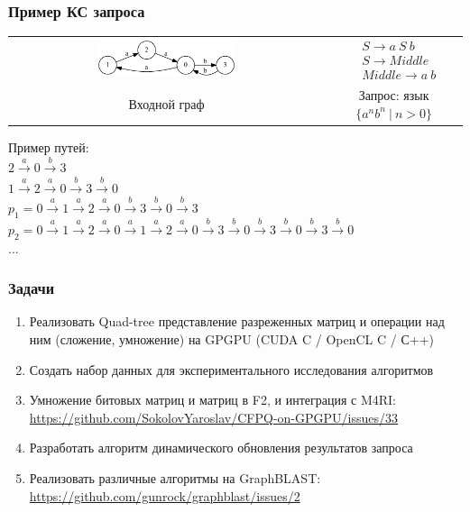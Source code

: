\documentclass[xcolor=table]{beamer}
\begin{document}
\begin{frame} \frametitle{Пример КС запроса}
\begin{center}
  \begin{tabular}{  c  c  }
      \includegraphics[width=0.45\textwidth]{pictures/input.pdf}
      &
  $

  \begin{array}{rl}
     & S \rightarrow a \ S \ b \\
     & S \rightarrow Middle \\
     & Middle \rightarrow a \ b
  \end{array}

  $
  \\
  Входной граф
  &
  Запрос: язык $\{a^nb^n \ | \ n > 0 \}$ 

  \end{tabular}

\end{center}

\pause

\vspace{0.5cm}
Пример путей: \\
$2 \xrightarrow{a} 0 \xrightarrow{b} 3$ \\
$1 \xrightarrow{a} 2 \xrightarrow{a} 0 \xrightarrow{b} 3 \xrightarrow{b} 0$ \\
$p_1 = 0 \xrightarrow{a} 1 \xrightarrow{a} 2 \xrightarrow{a} 0 \xrightarrow{b} 3 \xrightarrow{b} 0 \xrightarrow{b} 3$ \\
$p_2 = 0 \xrightarrow{a} 1 \xrightarrow{a} 2 \xrightarrow{a} 0 \xrightarrow{a} 1 \xrightarrow{a} 2 \xrightarrow{a} 0 \xrightarrow{b} 3 \xrightarrow{b} 0 \xrightarrow{b} 3 \xrightarrow{b} 0 \xrightarrow{b} 3 \xrightarrow{b} 0$ \\
$\dots$

\end{frame}

\begin{frame}[fragile] \frametitle{Задачи}
  \begin{enumerate}
    \item Реализовать Quad-tree представление разреженных матриц и операции над ним (сложение, умножение) на GPGPU (CUDA C / OpenCL C / С++)
    \pause
    \item Создать набор данных для экспериментального исследования алгоритмов
    \pause
    \item Умножение битовых матриц и матриц в F2, и интеграция с M4RI: \small{\url{https://github.com/SokolovYaroslav/CFPQ-on-GPGPU/issues/33}}
    \pause
    \item Разработать алгоритм динамического обновления результатов запроса
    \pause
    \item Реализовать различные алгоритмы на GraphBLAST: \url{https://github.com/gunrock/graphblast/issues/2}
  \end{enumerate}
\end{frame}
\end{document}

